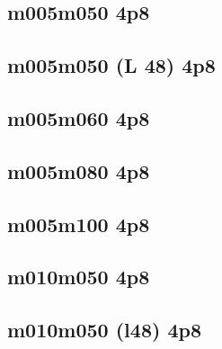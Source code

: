 \documentclass[pdftex,letterpaper,10pt]{article}
\begin{document}


\clearpage \subsection{m005m050 4p8}



\clearpage \subsection{m005m050 (L 48) 4p8}



\clearpage \subsection{m005m060 4p8}



\clearpage \subsection{m005m080 4p8}



\clearpage \subsection{m005m100 4p8}



\clearpage \subsection{m010m050 4p8}



\clearpage \subsection{m010m050 (l48) 4p8}
\end{document}

